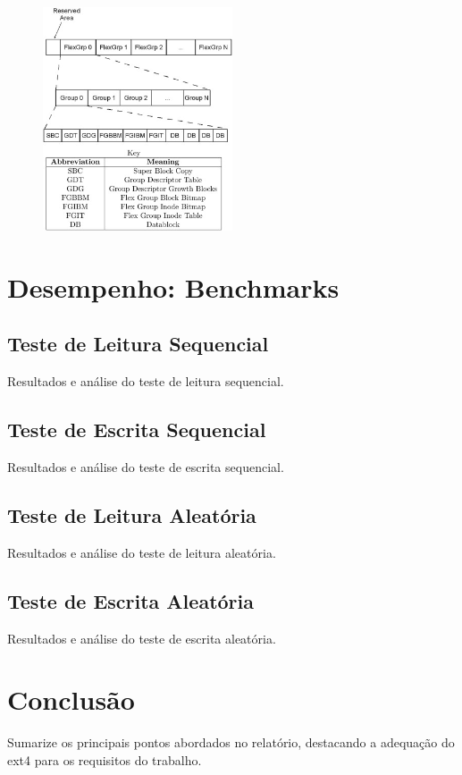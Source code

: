 \documentclass[
	12pt,				%
	openright,			%
	oneside,			%
	a4paper,			%
	chapter=TITLE,		%
	english,			%
	french,				%
	spanish,			%
	brazil				%
	]{abntex2}
\theoremstyle{definition}
\begin{document}
\begin{figure}[H]
	\centering
	\includegraphics[width=0.5\textwidth]{fig9.jpg}
	\caption{}
	\label{fig:9}
\end{figure}

\chapter{Desempenho: Benchmarks}

\section{Teste de Leitura Sequencial}
Resultados e análise do teste de leitura sequencial.

\section{Teste de Escrita Sequencial}
Resultados e análise do teste de escrita sequencial.

\section{Teste de Leitura Aleatória}
Resultados e análise do teste de leitura aleatória.

\section{Teste de Escrita Aleatória}
Resultados e análise do teste de escrita aleatória.

\chapter{Conclusão}
Sumarize os principais pontos abordados no relatório, destacando a adequação do ext4 para os requisitos do trabalho.

\postextual



\cite{tanenbaum2010sistemas}
\cite{FAIRBANKS2012S118}
\cite{bovet_cesati_2005}
\cite{Tso}
\cite{matur}
\cite{kumar}
\end{document}
